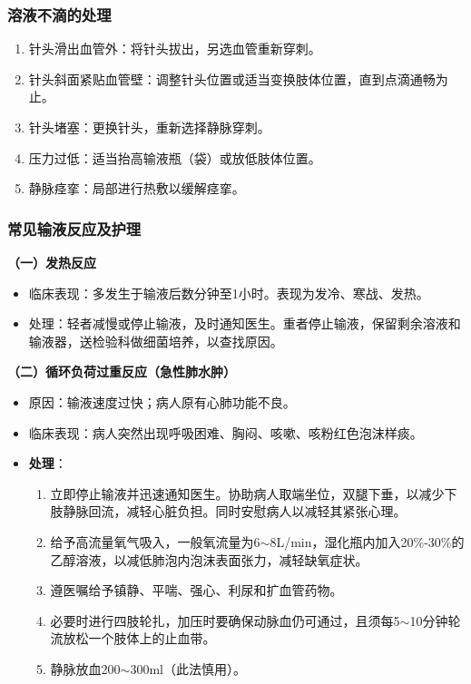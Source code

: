 \documentclass[11pt, a4paper]{ctexart}
\begin{document}
\subsubsection{溶液不滴的处理}
\begin{enumerate}
	\item 针头滑出血管外：将针头拔出，另选血管重新穿刺。
	\item 针头斜面紧贴血管壁：调整针头位置或适当变换肢体位置，直到点滴通畅为止。
	\item 针头堵塞：更换针头，重新选择静脉穿刺。
	\item 压力过低：适当抬高输液瓶（袋）或放低肢体位置。
	\item 静脉痉挛：局部进行热敷以缓解痉挛。
\end{enumerate}

\subsubsection{常见输液反应及护理}
\textbf{（一）发热反应}
\begin{itemize}
	\item 临床表现：多发生于输液后数分钟至1小时。表现为发冷、寒战、发热。
	\item 处理：轻者减慢或停止输液，及时通知医生。重者停止输液，保留剩余溶液和输液器，送检验科做细菌培养，以查找原因。
\end{itemize}

\textbf{（二）循环负荷过重反应（急性肺水肿）}
\begin{itemize}
	\item 原因：输液速度过快；病人原有心肺功能不良。
	\item 临床表现：病人突然出现呼吸困难、胸闷、咳嗽、咳粉红色泡沫样痰。
	\item \textbf{处理}：
	      \begin{enumerate}
		      \item 立即停止输液并迅速通知医生。协助病人取端坐位，双腿下垂，以减少下肢静脉回流，减轻心脏负担。同时安慰病人以减轻其紧张心理。
		      \item 给予高流量氧气吸入，一般氧流量为6$\sim$8L/min，湿化瓶内加入20\%-30\%的乙醇溶液，以减低肺泡内泡沫表面张力，减轻缺氧症状。
		      \item 遵医嘱给予镇静、平喘、强心、利尿和扩血管药物。
		      \item 必要时进行四肢轮扎，加压时要确保动脉血仍可通过，且须每5$\sim$10分钟轮流放松一个肢体上的止血带。
		      \item 静脉放血200$\sim$300ml（此法慎用）。
	      \end{enumerate}
\end{itemize}
\end{document}
